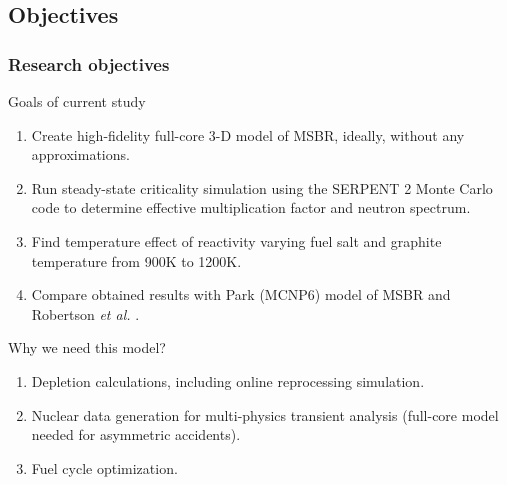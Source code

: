 \subsection{Objectives}
\begin{frame}
  \frametitle{Research objectives}
                  \vspace*{-0.1in}
              \begin{block}{Goals of current study}
               \begin{enumerate}
                \item Create high-fidelity full-core 3-D model of \gls{MSBR}, ideally, without any approximations.
                \item Run steady-state criticality simulation using the SERPENT 2 Monte Carlo code \cite{leppanen_serpent_2012} 
                  to determine effective multiplication factor and neutron spectrum.
                \item Find temperature effect of reactivity varying fuel salt and graphite temperature from 900K to 1200K.
                \item Compare obtained results with Park (MCNP6) model of MSBR \cite{park_whole_2015}
                and Robertson \emph{et al.} \cite{robertson_conceptual_1971}.
               \end{enumerate}
               \end{block}
               
               \begin{block}{Why we need this model?}
               \begin{enumerate}
                \item Depletion calculations, including online reprocessing simulation.
                \item Nuclear data generation for multi-physics transient analysis (full-core model needed for asymmetric
                	accidents).
                \item Fuel cycle optimization.
               \end{enumerate}
               \end{block}

\end{frame}

